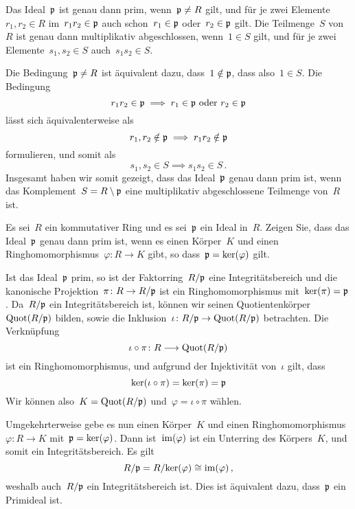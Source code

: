 \documentclass{scrartcl}
\begin{document}
\begin{solution}
  Das Ideal~$\mathfrak{p}$ ist genau dann prim, wenn~$\mathfrak{p} \neq R$ gilt, und für je zwei Elemente~$r_1, r_2 \in R$ im~$r_1 r_2 \in \mathfrak{p}$ auch schon~$r_1 \in \mathfrak{p}$ oder~$r_2 \in \mathfrak{p}$ gilt.
  Die Teilmenge~$S$ von~$R$ ist genau dann multiplikativ abgeschlossen, wenn~$1 \in S$ gilt, und für je zwei Elemente~$s_1, s_2 \in S$ auch~$s_1 s_2 \in S$.

  Die Bedingung~$\mathfrak{p} \neq R$ ist äquivalent dazu, dass~$1 \notin \mathfrak{p}$, dass also~$1 \in S$.
  Die Bedingung
  \[
    r_1 r_2 \in \mathfrak{p}
    \implies
    \text{$r_1 \in \mathfrak{p}$ oder~$r_2 \in \mathfrak{p}$}
  \]
  lässt sich äquivalenterweise als
  \[
    r_1, r_2 \notin \mathfrak{p} \implies r_1 r_2 \notin \mathfrak{p}
  \]
  formulieren, und somit als
  \[
    s_1, s_2 \in S \implies s_1 s_2 \in S \,.
  \]
  Insgesamt haben wir somit gezeigt, dass das Ideal~$\mathfrak{p}$ genau dann prim ist, wenn das Komplement~$S = R \setminus \mathfrak{p}$ eine multiplikativ abgeschlossene Teilmenge von~$R$ ist.
\end{solution}

\begin{exercise}
  Es sei~$R$ ein kommutativer Ring und es sei~$\mathfrak{p}$ ein Ideal in~$R$.
  Zeigen Sie, dass das Ideal~$\mathfrak{p}$ genau dann prim ist, wenn es einen Körper~$K$ und einen Ringhomomorphismus~$\varphi \colon R \to K$ gibt, so dass~$\mathfrak{p} = \ker(\varphi)$ gilt.
\end{exercise}

\begin{solution}
  Ist das Ideal~$\mathfrak{p}$ prim, so ist der Faktorring~$R/\mathfrak{p}$ eine Integritätsbereich und die kanonische Projektion~$\pi \colon R \to R/\pideal$ ist ein Ringhomomorphismus mit~$\ker(\pi) = \mathfrak{p}$.
  Da~$R/\mathfrak{p}$ ein Integritätsbereich ist, können wir seinen Quotientenkörper~$\operatorname{Quot}(R/\mathfrak{p})$ bilden, sowie die Inklusion~$\iota \colon R/\pideal \to \Quot(R/\pideal)$ betrachten.
  Die Verknüpfung
  \[
    \iota \circ \pi
    \colon
    R
    \to
    \Quot(R/\pideal)
  \]
  ist ein Ringhomomorphismus, und aufgrund der Injektivität von~$\iota$ gilt, dass
  \[
    \ker(\iota \circ \pi)
    =
    \ker(\pi)
    =
    \mathfrak{p}
  \]
  Wir können also~$K = \operatorname{Quot}(R/\mathfrak{p})$ und~$\varphi = \iota \circ \pi$ wählen.

  Umgekehrterweise gebe es nun einen Körper~$K$ und einen Ringhomomorphismus~$\varphi \colon R \to K$ mit~$\mathfrak{p} = \ker(\varphi)$.
  Dann ist~$\operatorname{im}(\varphi)$ ist ein Unterring des Körpers~$K$, und somit ein Integritätsbereich.
  Es gilt
  \[
    R / \mathfrak{p}
    =
    R / {\ker(\varphi)}
    \cong
    \operatorname{im}(\varphi) \,,
  \]
  weshalb auch~$R/\mathfrak{p}$ ein Integritätsbereich ist.
  Dies ist äquivalent dazu, dass~$\mathfrak{p}$ ein Primideal ist.
\end{solution}




\clearpage




\printsolutions
\end{document}
